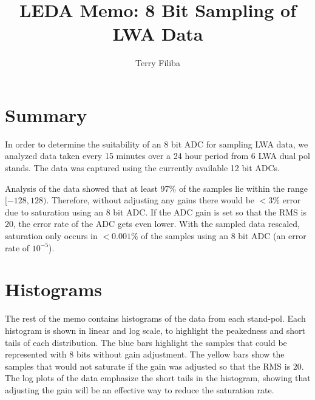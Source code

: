 \documentclass[fleqn, onecolumn]{article}
\begin{document}
\title{LEDA Memo: 8 Bit Sampling of LWA Data}
\date{}
\author{Terry Filiba}
\maketitle

\section{Summary}
In order to determine the suitability of an 8 bit ADC for sampling LWA data, we analyzed data taken every 15 minutes over a 24 hour period from 6 LWA dual pol stands. 
The data was captured using the currently available 12 bit ADCs.

Analysis of the data showed that at least 97\% of the samples lie within the range $[-128,128)$. 
Therefore, without adjusting any gains there would be $< 3\%$ error due to saturation using an 8 bit ADC.
If the ADC gain is set so that the RMS is $20$, the error rate of the ADC gets even lower. 
With the sampled data rescaled, saturation only occurs in $<0.001\%$ of the samples using an 8 bit ADC (an error rate of $10^{-5}$). 

\begin{table}[h]

\end{table}

\section{Histograms}
The rest of the memo contains histograms of the data from each stand-pol. 
Each histogram is shown in linear and log scale, to highlight the peakedness and short tails of each distribution. 
The blue bars highlight the samples that could be represented with 8 bits without gain adjustment. 
The yellow bars show the samples that would not saturate if the gain was adjusted so that the RMS is $20$.
The log plots of the data emphasize the short tails in the histogram, showing that adjusting the gain will be an effective way to reduce the saturation rate. 

\end{document}
